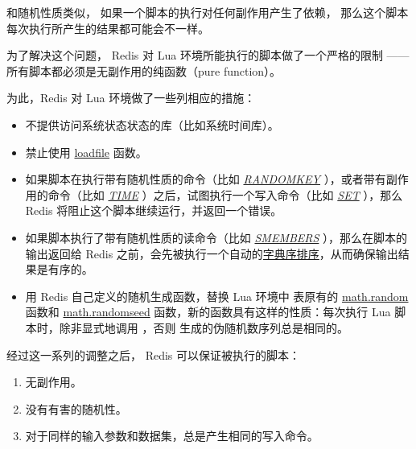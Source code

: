 \documentclass[a4paper,11pt,english]{sphinxmanual}
\begin{document}
和随机性质类似，
如果一个脚本的执行对任何副作用产生了依赖，
那么这个脚本每次执行所产生的结果都可能会不一样。

为了解决这个问题，
Redis 对 Lua 环境所能执行的脚本做了一个严格的限制 ——
所有脚本都必须是无副作用的纯函数（pure function）。

为此，Redis 对 Lua 环境做了一些列相应的措施：
\begin{itemize}
\item {} 
不提供访问系统状态状态的库（比如系统时间库）。

\item {} 
禁止使用 \href{http://pgl.yoyo.org/luai/i/loadfile}{loadfile} 函数。

\item {} 
如果脚本在执行带有随机性质的命令（比如 \href{http://redis.readthedocs.org/en/latest/key/randomkey.html\#randomkey}{\emph{RANDOMKEY}} ），或者带有副作用的命令（比如 \href{http://redis.readthedocs.org/en/latest/server/time.html\#time}{\emph{TIME}} ）之后，试图执行一个写入命令（比如 \href{http://redis.readthedocs.org/en/latest/string/set.html\#set}{\emph{SET}} ），那么 Redis 将阻止这个脚本继续运行，并返回一个错误。

\item {} 
如果脚本执行了带有随机性质的读命令（比如 \href{http://redis.readthedocs.org/en/latest/set/smembers.html\#smembers}{\emph{SMEMBERS}} ），那么在脚本的输出返回给 Redis 之前，会先被执行一个自动的\href{http://en.wikipedia.org/wiki/Lexicographical\_order}{字典序排序}，从而确保输出结果是有序的。

\item {} 
用 Redis 自己定义的随机生成函数，替换 Lua 环境中  表原有的 \href{http://pgl.yoyo.org/luai/i/math.random}{math.random} 函数和 \href{http://pgl.yoyo.org/luai/i/math.randomseed}{math.randomseed} 函数，新的函数具有这样的性质：每次执行 Lua 脚本时，除非显式地调用  ，否则  生成的伪随机数序列总是相同的。

\end{itemize}

经过这一系列的调整之后，
Redis 可以保证被执行的脚本：
\begin{enumerate}
\item {} 
无副作用。

\item {} 
没有有害的随机性。

\item {} 
对于同样的输入参数和数据集，总是产生相同的写入命令。

\end{enumerate}
\end{document}
